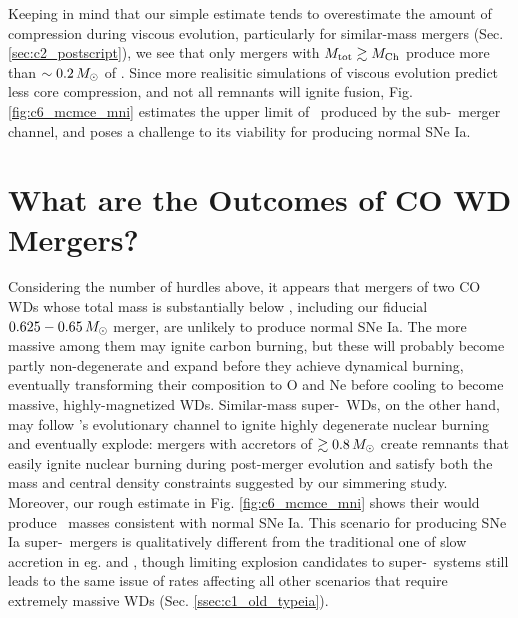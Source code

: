 Keeping in mind that our simple estimate tends to overestimate the amount of compression during viscous evolution, particularly for similar-mass mergers (Sec. \ref{sec:c2_postscript}), we see that only mergers with $\Mtot \gtrsim \Mch$ produce more than $\sim0.2\,\Msun$ of \Ni.  Since more realisitic simulations of viscous evolution predict less core compression, and not all remnants will ignite fusion, Fig. \ref{fig:c6_mcmce_mni} estimates the upper limit of \Ni\ produced by the sub-\Mch\ merger channel, and poses a challenge to its viability for producing normal SNe Ia.

\section{What are the Outcomes of CO WD Mergers?}

Considering the number of hurdles above, it appears that mergers of two CO WDs whose total mass is substantially below \Mch, including our fiducial $0.625 - 0.65\,\Msun$ merger, are unlikely to produce normal SNe Ia.  The more massive among them may ignite carbon burning, but these will probably become partly non-degenerate and expand before they achieve dynamical burning, eventually transforming their composition to O and Ne before cooling to become massive, highly-magnetized WDs.  Similar-mass super-\Mch\ WDs, on the other hand, may follow \citeal{vkercj10}'s evolutionary channel to ignite highly degenerate nuclear burning and eventually explode: mergers with accretors of $\gtrsim0.8\,\Msun$ create remnants that easily ignite nuclear burning during post-merger evolution and satisfy both the mass and central density constraints suggested by our simmering study.  Moreover, our rough estimate in Fig. \ref{fig:c6_mcmce_mni} shows their would produce \Ni\ masses consistent with normal SNe Ia.  This scenario for producing SNe Ia super-\Mch\ mergers is qualitatively different from the traditional one of slow accretion in eg. \cite{nomoi85} and \cite{yoonpr07}, though limiting explosion candidates to super-\Mch\ systems still leads to the same issue of rates affecting all other scenarios that require extremely massive WDs (Sec. \ref{ssec:c1_old_typeia}).


